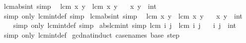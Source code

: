 \begin{isabellebody}
\ lcm{\isacharunderscore}{\kern0pt}abs{}{\isacharunderscore}{\kern0pt}int\ {\isacharbrackleft}{\kern0pt}simp{\isacharbrackright}{\kern0pt}{\isacharcolon}{\kern0pt}\isanewline
\ \ {\isachardoublequoteopen}lcm\ {\isasymbar}x{\isasymbar}\ y\ {\isacharequal}{\kern0pt}\ lcm\ x\ y{\isachardoublequoteclose}\isanewline
\ \ \ x\ y\ {\isacharcolon}{\kern0pt}{\isacharcolon}{\kern0pt}\ int\isanewline
%
\isadelimproof
\ \ %
\endisadelimproof
%
\isatagproof
{}\isamarkupfalse%
\ {\isacharparenleft}{\kern0pt}simp\ only{\isacharcolon}{\kern0pt}\ lcm{\isacharunderscore}{\kern0pt}int{\isacharunderscore}{\kern0pt}def{\isacharparenright}{\kern0pt}\ simp%
\endisatagproof
{\isafoldproof}%
%
\isadelimproof
\isanewline
%
\endisadelimproof
\isanewline
{}\isamarkupfalse%
\ lcm{\isacharunderscore}{\kern0pt}abs{}{\isacharunderscore}{\kern0pt}int\ {\isacharbrackleft}{\kern0pt}simp{\isacharbrackright}{\kern0pt}{\isacharcolon}{\kern0pt}\isanewline
\ \ {\isachardoublequoteopen}lcm\ x\ {\isasymbar}y{\isasymbar}\ {\isacharequal}{\kern0pt}\ lcm\ x\ y{\isachardoublequoteclose}\isanewline
\ \ \ x\ y\ {\isacharcolon}{\kern0pt}{\isacharcolon}{\kern0pt}\ int\isanewline
%
\isadelimproof
\ \ %
\endisadelimproof
%
\isatagproof
{}\isamarkupfalse%
\ {\isacharparenleft}{\kern0pt}simp\ only{\isacharcolon}{\kern0pt}\ lcm{\isacharunderscore}{\kern0pt}int{\isacharunderscore}{\kern0pt}def{\isacharparenright}{\kern0pt}\ simp%
\endisatagproof
{\isafoldproof}%
%
\isadelimproof
\isanewline
%
\endisadelimproof
\isanewline
{}\isamarkupfalse%
\ abs{\isacharunderscore}{\kern0pt}lcm{\isacharunderscore}{\kern0pt}int\ {\isacharbrackleft}{\kern0pt}simp{\isacharbrackright}{\kern0pt}{\isacharcolon}{\kern0pt}\ {\isachardoublequoteopen}{\isasymbar}lcm\ i\ j{\isasymbar}\ {\isacharequal}{\kern0pt}\ lcm\ i\ j{\isachardoublequoteclose}\isanewline
\ \ \ i\ j\ {\isacharcolon}{\kern0pt}{\isacharcolon}{\kern0pt}\ int\isanewline
%
\isadelimproof
\ \ %
\endisadelimproof
%
\isatagproof
{}\isamarkupfalse%
\ {\isacharparenleft}{\kern0pt}simp\ only{\isacharcolon}{\kern0pt}\ lcm{\isacharunderscore}{\kern0pt}int{\isacharunderscore}{\kern0pt}def{\isacharparenright}{\kern0pt}%
\endisatagproof
{\isafoldproof}%
%
\isadelimproof
\isanewline
%
\endisadelimproof
\isanewline
{}\isamarkupfalse%
\ gcd{\isacharunderscore}{\kern0pt}nat{\isacharunderscore}{\kern0pt}induct\ {\isacharbrackleft}{\kern0pt}case{\isacharunderscore}{\kern0pt}names\ base\ step{\isacharbrackright}{\kern0pt}{\isacharcolon}{\kern0pt}\isanewline

\end{isabellebody}
